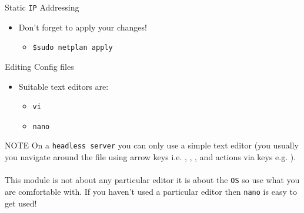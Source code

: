 \documentclass[aspectratio=169]{beamer}
\begin{document}
\begin{frame}{Static \texttt{IP} Addressing}
  \begin{itemize}
    \item Don't forget to apply your changes!
    \begin{itemize}
      \item \texttt{\$sudo netplan apply}
    \end{itemize}
  \end{itemize}
\end{frame}

\begin{frame}{Editing Config files}
  \begin{itemize}
    \item Suitable text editors are:
    \begin{itemize}
      \item \texttt{vi}
      \item \texttt{nano}
    \end{itemize}
  \end{itemize}
  \begin{block}{NOTE}
    On a \texttt{headless server} you can only use a simple text editor (you usually you navigate around the file using arrow keys i.e. \keys{\textuparrow}, \keys{\textdownarrow}, \keys{\textleftarrow}, \keys{\textrightarrow} and actions via  keys e.g. ).\\~\\
    This module is not about any particular editor it is about the \texttt{OS} so use what you are comfortable with. If you haven't used a particular editor then \texttt{nano} is easy to get used!
  \end{block}
\end{frame}
\end{document}
